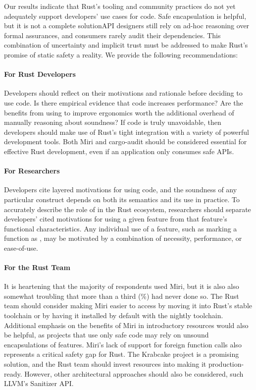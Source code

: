 Our results indicate that Rust's tooling and community practices do not yet adequately support developers' use cases for \unsafe code. Safe encapsulation is helpful, but it is not a complete solution\textemdash API designers still rely on ad-hoc reasoning over formal assurances, and consumers rarely audit their dependencies. This combination of uncertainty and implicit trust must be addressed to make Rust's promise of static safety a reality. We provide the following recommendations:

\paragraph{For Rust Developers} Developers should reflect on their motivations and rationale before deciding to use \unsafe code. Is there empirical evidence that \unsafe code increases performance? Are the benefits from using \unsafe to improve ergonomics worth the additional overhead of manually reasoning about soundness? If \unsafe code is truly unavoidable, then developers should make use of Rust's tight integration with a variety of powerful development tools. Both Miri and cargo-audit should be considered essential for effective Rust development, even if an application only consumes safe APIs.
\paragraph{For Researchers} Developers cite layered motivations for using \unsafe code, and the soundness of any particular \unsafe construct depends on both its semantics and its use in practice. To accurately describe the role of \unsafe in the Rust ecosystem, researchers should separate developers' cited motivations for using a given feature from that feature's functional characteristics. Any individual use of a feature, such as marking a function as \unsafe, may be motivated by a combination of necessity, performance, or ease-of-use.


\paragraph{For the Rust Team} It is heartening that the majority of respondents used Miri, but it is also also somewhat troubling that more than a third (\nomiri\%) had never done so. The Rust team should consider making Miri easier to access by moving it into Rust's stable toolchain or by having it installed by default with the nightly toolchain. Additional emphasis on the benefits of Miri in introductory resources would also be helpful, as projects that use only safe code may rely on unsound encapsulations of \unsafe features. Miri's lack of support for foreign function calls also represents a critical safety gap for Rust. The Krabcake project is a promising solution, and the Rust team should invest resources into making it production-ready. However, other architectural approaches should also be considered, such LLVM's Sanitizer API.

